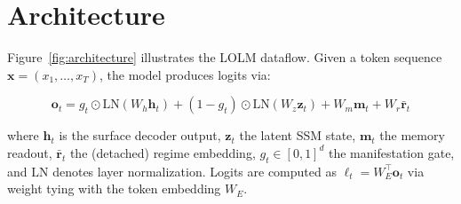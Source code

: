 \documentclass{article}
\begin{document}
\section{Architecture}
\label{sec:architecture}

Figure~\ref{fig:architecture} illustrates the LOLM dataflow. Given a token
sequence $\mathbf{x} = (x_1, \ldots, x_T)$, the model produces logits via:

\begin{equation}
\label{eq:fusion}
\mathbf{o}_t = g_t \odot \text{LN}(W_h \mathbf{h}_t) + (1 - g_t) \odot \text{LN}(W_z \mathbf{z}_t) + W_m \mathbf{m}_t + W_r \bar{\mathbf{r}}_t
\end{equation}

where $\mathbf{h}_t$ is the surface decoder output, $\mathbf{z}_t$ the latent
SSM state, $\mathbf{m}_t$ the memory readout, $\bar{\mathbf{r}}_t$ the
(detached) regime embedding, $g_t \in [0,1]^d$ the manifestation gate, and
$\text{LN}$ denotes layer normalization. Logits are computed as $\ell_t = W_E^\top \mathbf{o}_t$ via weight tying with the token embedding $W_E$.
\end{document}
